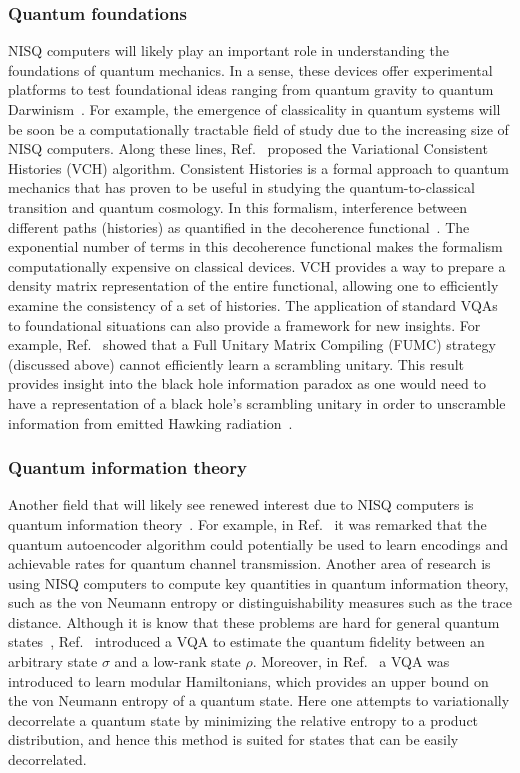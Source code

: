 \documentclass[prx,twocolumn,floatfix,superscriptaddress,longbibliography]{revtex4-1}
\newcommand{\<}{\langle}
\renewcommand{\>}{\rangle}
\begin{document}
\subsubsection{ Quantum foundations} NISQ computers will likely play an important role in understanding the foundations of quantum mechanics. In a sense, these devices offer experimental platforms to test foundational ideas ranging from quantum gravity to quantum Darwinism~\cite{zurek2009quantum}. For example, the emergence of classicality in quantum systems will be soon be a computationally tractable field of study due to the increasing size of NISQ computers. Along these lines, Ref.~\cite{arrasmith2019variational} proposed the Variational Consistent Histories (VCH) algorithm. Consistent Histories is a formal approach to quantum mechanics that has proven to be useful in studying the quantum-to-classical transition and quantum cosmology. In this formalism, interference between different paths (histories) as quantified in the decoherence functional~\cite{griffiths2003consistent}. The exponential number of terms in this decoherence functional makes the formalism computationally expensive on classical devices. VCH provides a way to prepare a density matrix representation of the entire functional, allowing one to efficiently examine the consistency of a set of histories. The application of standard VQAs to foundational situations can also provide a framework for new insights. For example, Ref.~\cite{holmes2020barren} showed that a Full Unitary Matrix Compiling (FUMC) strategy (discussed above) cannot efficiently learn a scrambling unitary. This result provides insight into the black hole information paradox as one would need to have a representation of a black hole's scrambling unitary in order to unscramble information from emitted Hawking radiation~\cite{hayden2007black}.

\subsubsection{ Quantum information theory} Another field that will likely see renewed interest due to NISQ computers is quantum information theory~\cite{wilde2013quantum}. For example, in Ref.~\cite{Romero} it was remarked that the quantum autoencoder algorithm could potentially be used to learn encodings and achievable rates for quantum channel transmission. Another area of research is using NISQ computers to compute key quantities in quantum information theory, such as the von Neumann entropy or distinguishability measures such as the trace distance. Although it is know that these problems are hard for general quantum states~\cite{watrous}, Ref.~\cite{cerezo2019variational} introduced a VQA to estimate the quantum fidelity between an arbitrary state $\sigma$ and a low-rank state $\rho$. Moreover, in Ref.~\cite{verdon2019quantumVQT} a VQA was introduced to learn modular Hamiltonians, which provides an upper bound on the von Neumann entropy of a quantum state. Here one attempts to variationally decorrelate a quantum state by minimizing the relative entropy to a product distribution, and hence this method is suited for states that can be easily decorrelated.
\end{document}
